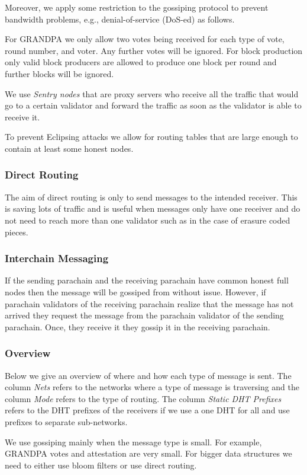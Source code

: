 Moreover, we apply some restriction to the gossiping protocol to prevent bandwidth problems, e.g., denial-of-service (DoS-ed) as follows.

For GRANDPA we only allow two votes being received for each type of vote, round number, and voter. Any further votes will be ignored.
For block production only valid block producers are allowed to produce one block per round and further blocks will be ignored.

We use \emph{Sentry nodes} that are proxy servers who receive all the traffic that would go to a certain validator and forward the traffic as soon as the validator is able to receive it.

To prevent Eclipsing attacks \cite{} we allow for routing tables that are large enough to contain at least some honest nodes.

\subsubsection{Direct Routing}
The aim of direct routing is only to send messages to the intended receiver.
This is saving lots of traffic and is useful when messages only have one receiver and do not need to reach more than one validator such as in the case of erasure coded pieces.

\subsubsection{Interchain Messaging}
If the sending parachain and the receiving parachain have common honest full nodes then the message will be gossiped from without issue.
However, if parachain validators of the receiving parachain realize that the message has not arrived they request the message from the parachain validator of the sending parachain.
Once, they receive it they gossip it in the receiving parachain.

\subsubsection{Overview}
Below we give an overview of where and how each type of message is sent. The column \emph{Nets} refers to the networks where a type of message is traversing and the column \emph{Mode} refers to the type of  routing. The column \emph{Static DHT Prefixes} refers to the DHT prefixes of the receivers if we use a one DHT for all and use prefixes to separate sub-networks.

We use gossiping mainly when the message type is small. For example, GRANDPA votes and attestation are very small. For bigger data structures we need to either use bloom filters or use direct routing.


